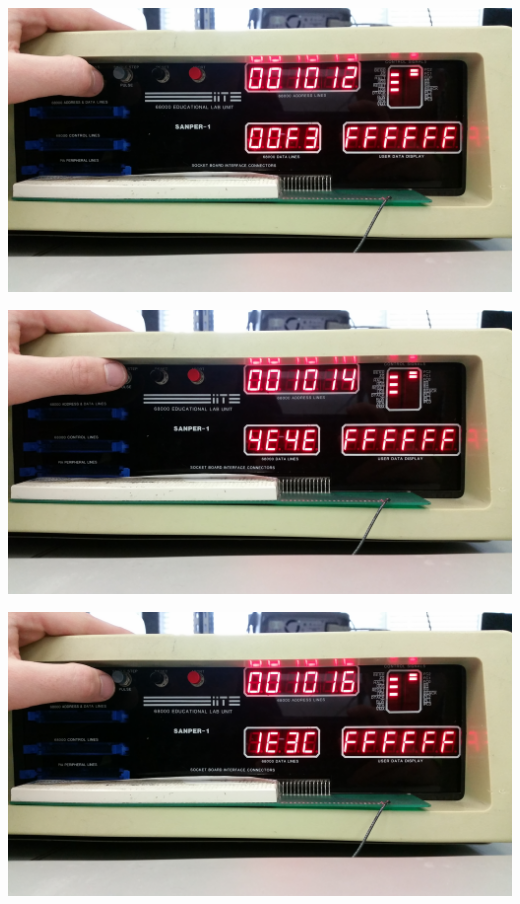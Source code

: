 \documentclass[12pt, twocolumn]{article}
\begin{document}
\begin{center}
\includegraphics[width=1\linewidth]{Lab1/20150120_093616}
\end{center}
\begin{center}
\includegraphics[width=1\linewidth]{Lab1/20150120_093618}
\end{center}
\begin{center}
\includegraphics[width=1\linewidth]{Lab1/20150120_093620}
\end{center}
\end{document}
